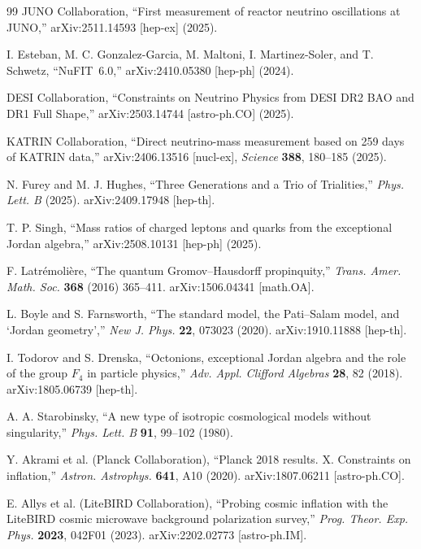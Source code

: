 \documentclass[12pt,a4paper]{article}
\theoremstyle{definition}
\begin{document}
\begin{thebibliography}{99}
JUNO Collaboration, ``First measurement of reactor neutrino oscillations at JUNO,'' arXiv:2511.14593 [hep-ex] (2025).

I. Esteban, M. C. Gonzalez-Garcia, M. Maltoni, I. Martinez-Soler, and T. Schwetz, ``NuFIT~6.0,'' arXiv:2410.05380 [hep-ph] (2024).

DESI Collaboration, ``Constraints on Neutrino Physics from DESI DR2 BAO and DR1 Full Shape,'' arXiv:2503.14744 [astro-ph.CO] (2025).

KATRIN Collaboration, ``Direct neutrino-mass measurement based on 259 days of KATRIN data,'' arXiv:2406.13516 [nucl-ex], \textit{Science} \textbf{388}, 180--185 (2025).

N. Furey and M. J. Hughes, ``Three Generations and a Trio of Trialities,'' \textit{Phys. Lett. B} (2025). arXiv:2409.17948 [hep-th].

T. P. Singh, ``Mass ratios of charged leptons and quarks from the exceptional Jordan algebra,'' arXiv:2508.10131 [hep-ph] (2025).

F. Latr\'emoli\`ere, ``The quantum Gromov--Hausdorff propinquity,'' \textit{Trans. Amer. Math. Soc.} \textbf{368} (2016) 365--411. arXiv:1506.04341 [math.OA].

L. Boyle and S. Farnsworth, ``The standard model, the Pati--Salam model, and `Jordan geometry','' \textit{New J. Phys.} \textbf{22}, 073023 (2020). arXiv:1910.11888 [hep-th].

I. Todorov and S. Drenska, ``Octonions, exceptional Jordan algebra and the role of the group $F_4$ in particle physics,'' \textit{Adv. Appl. Clifford Algebras} \textbf{28}, 82 (2018). arXiv:1805.06739 [hep-th].

A. A. Starobinsky, ``A new type of isotropic cosmological models without singularity,'' \textit{Phys. Lett. B} \textbf{91}, 99--102 (1980).

Y. Akrami et al. (Planck Collaboration), ``Planck 2018 results. X. Constraints on inflation,'' \textit{Astron. Astrophys.} \textbf{641}, A10 (2020). arXiv:1807.06211 [astro-ph.CO].

E. Allys et al. (LiteBIRD Collaboration), ``Probing cosmic inflation with the LiteBIRD cosmic microwave background polarization survey,'' \textit{Prog. Theor. Exp. Phys.} \textbf{2023}, 042F01 (2023). arXiv:2202.02773 [astro-ph.IM].


\end{thebibliography}
\end{document}
